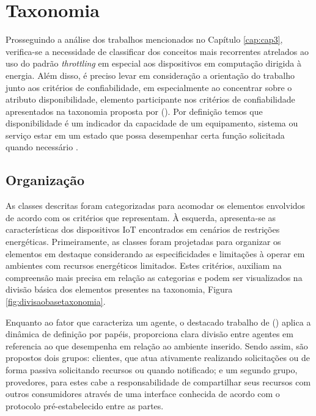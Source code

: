\chapter{Taxonomia}
\label{cap:cap4}

Prosseguindo a análise dos trabalhos mencionados no Capítulo \ref{cap:cap3}, verifica-se a necessidade de classificar dos conceitos mais recorrentes atrelados ao uso do padrão \textit{throttling} em especial aos dispositivos em computação dirigida à energia. Além disso, é preciso levar em consideração a orientação do trabalho junto aos critérios de confiabilidade, em especialmente ao concentrar sobre o atributo disponibilidade, elemento participante nos critérios de confiabilidade apresentados na taxonomia proposta por \citeauthor{avizienis_basic_2004} (\citeyear{avizienis_basic_2004}). Por definição temos que disponibilidade é um indicador da capacidade de um equipamento, sistema ou serviço estar em um estado que possa desempenhar certa função solicitada quando necessário \cite{ISO9000}. 


\section{Organização}

As classes descritas foram categorizadas para acomodar os elementos envolvidos de acordo com os critérios que representam. À esquerda, apresenta-se as características dos dispositivos \acs{IoT} encontrados em cenários de restrições energéticas. Primeiramente, as classes foram projetadas para organizar os elementos em destaque considerando as especificidades e limitações à operar em ambientes com recursos energéticos limitados. Estes critérios, auxiliam na compreensão mais precisa em relação as categorias e podem ser visualizados na divisão básica dos elementos presentes na taxonomia, Figura \ref{fig:divisaobasetaxonomia}. 

Enquanto ao fator que caracteriza um agente, o destacado trabalho de \citeauthor{avizienis_basic_2004} (\citeyear{avizienis_basic_2004}) aplica a dinâmica de definição por papéis, proporciona clara divisão entre agentes em referencia ao que desempenha em relação ao ambiente inserido. Sendo assim, são propostos dois grupos: clientes, que atua ativamente realizando solicitações ou de forma passiva solicitando recursos ou quando notificado; e um segundo grupo, provedores, para estes cabe a responsabilidade de compartilhar seus recursos com outros consumidores através de uma interface conhecida de acordo com o protocolo pré-estabelecido entre as partes.


